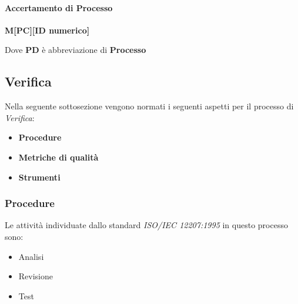 \paragraph{Accertamento di Processo}
\begin{center}
    \textbf{M[PC][ID numerico]}
\end{center}
Dove \textbf{PD} è abbreviazione di \textbf{Processo}


\subsection{Verifica}
\label{sec:Verifica}
Nella seguente sottosezione vengono normati i seguenti aspetti per il 
processo di \textit{Verifica}:
\begin{itemize}
    \item \textbf{Procedure}
    \item \textbf{Metriche di qualità}
    \item \textbf{Strumenti}
\end{itemize}

\subsubsection{Procedure}
Le attività individuate dallo standard \textit{ISO/IEC 12207:1995} in questo processo sono:
\begin{itemize}
    \item Analisi
    \item Revisione
    \item Test
\end{itemize}

